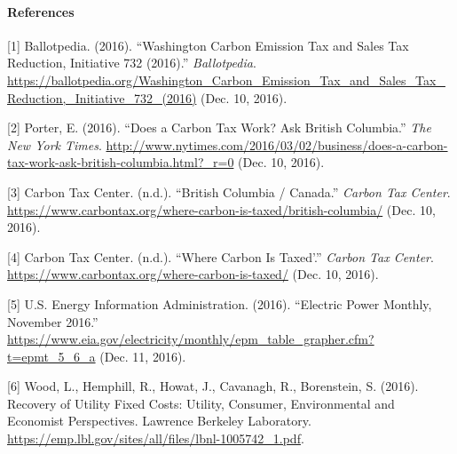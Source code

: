 \documentclass{article}
\begin{document}
	

\paragraph{References}
[1] Ballotpedia. (2016). ``Washington Carbon Emission Tax and Sales Tax Reduction, Initiative 732 (2016).'' \textit{Ballotpedia}. \url{https://ballotpedia.org/Washington_Carbon_Emission_Tax_and_Sales_Tax_Reduction,_Initiative_732_(2016)} (Dec. 10, 2016).

[2] Porter, E. (2016). ``Does a Carbon Tax Work? Ask British Columbia.'' \textit{The New York Times}. \url{http://www.nytimes.com/2016/03/02/business/does-a-carbon-tax-work-ask-british-columbia.html?_r=0} (Dec. 10, 2016).

[3] Carbon Tax Center. (n.d.). ``British Columbia / Canada.'' \textit{Carbon Tax Center}. \url{https://www.carbontax.org/where-carbon-is-taxed/british-columbia/} (Dec. 10, 2016).

[4] Carbon Tax Center. (n.d.). ``Where Carbon Is Taxed'.'' \textit{Carbon Tax Center}. \url{https://www.carbontax.org/where-carbon-is-taxed/} (Dec. 10, 2016).

[5] U.S. Energy Information Administration. (2016). ``Electric Power Monthly, November 2016.'' \url{https://www.eia.gov/electricity/monthly/epm_table_grapher.cfm?t=epmt_5_6_a} (Dec. 11, 2016).

[6] Wood, L., Hemphill, R., Howat, J., Cavanagh, R., Borenstein, S. (2016). Recovery of Utility Fixed Costs: Utility, Consumer, Environmental and Economist Perspectives. Lawrence Berkeley Laboratory. \url{https://emp.lbl.gov/sites/all/files/lbnl-1005742_1.pdf}.
\end{document}
